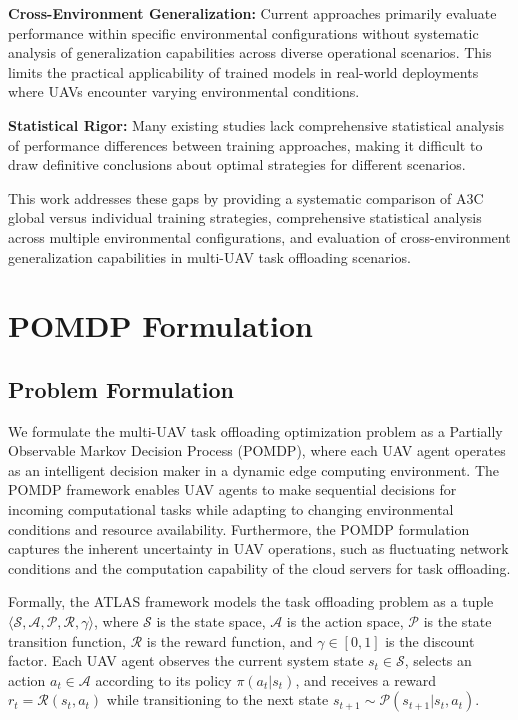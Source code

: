\documentclass[journal]{IEEEtran}
\begin{document}
\textbf{Cross-Environment Generalization:} Current approaches primarily evaluate performance within specific environmental configurations without systematic analysis of generalization capabilities across diverse operational scenarios. This limits the practical applicability of trained models in real-world deployments where UAVs encounter varying environmental conditions.

\textbf{Statistical Rigor:} Many existing studies lack comprehensive statistical analysis of performance differences between training approaches, making it difficult to draw definitive conclusions about optimal strategies for different scenarios.

This work addresses these gaps by providing a systematic comparison of A3C global versus individual training strategies, comprehensive statistical analysis across multiple environmental configurations, and evaluation of cross-environment generalization capabilities in multi-UAV task offloading scenarios.

\section{POMDP Formulation}
\label{sec:POMDP}

\subsection{Problem Formulation}

We formulate the multi-UAV task offloading optimization problem as a Partially Observable Markov Decision Process (POMDP), where each UAV agent operates as an intelligent decision maker in a dynamic edge computing environment. The POMDP framework enables UAV agents to make sequential decisions for incoming computational tasks while adapting to changing environmental conditions and resource availability. Furthermore, the POMDP formulation captures the inherent uncertainty in UAV operations, such as fluctuating network conditions and the computation capability of the cloud servers for task offloading.

Formally, the ATLAS framework models the task offloading problem as a tuple $\langle \mathcal{S}, \mathcal{A}, \mathcal{P}, \mathcal{R}, \gamma \rangle$, where $\mathcal{S}$ is the state space, $\mathcal{A}$ is the action space, $\mathcal{P}$ is the state transition function, $\mathcal{R}$ is the reward function, and $\gamma \in [0,1]$ is the discount factor. Each UAV agent observes the current system state $s_t \in \mathcal{S}$, selects an action $a_t \in \mathcal{A}$ according to its policy $\pi(a_t|s_t)$, and receives a reward $r_t = \mathcal{R}(s_t, a_t)$ while transitioning to the next state $s_{t+1} \sim \mathcal{P}(s_{t+1}|s_t, a_t)$.
\end{document}

